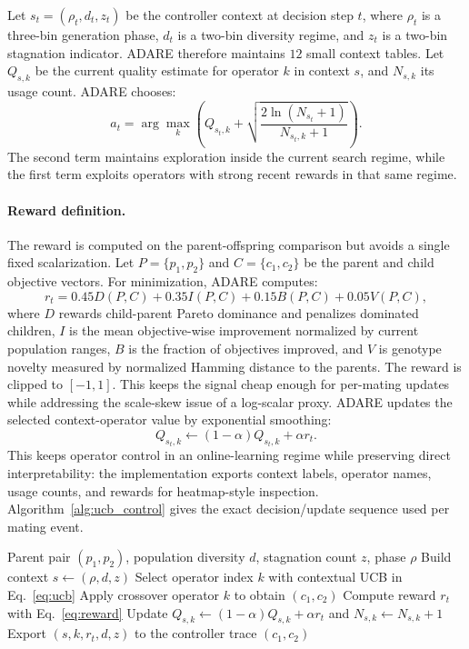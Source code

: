 \documentclass[runningheads]{llncs}
\begin{document}
Let $s_t=(\rho_t,d_t,z_t)$ be the controller context at decision step $t$, where $\rho_t$ is a three-bin generation phase, $d_t$ is a two-bin diversity regime, and $z_t$ is a two-bin stagnation indicator. ADARE therefore maintains $12$ small context tables. Let $Q_{s,k}$ be the current quality estimate for operator $k$ in context $s$, and $N_{s,k}$ its usage count. ADARE chooses:
\begin{equation}
\label{eq:ucb}
a_t = \arg\max_k \left( Q_{s_t,k} + \sqrt{\frac{2 \ln (N_{s_t}+1)}{N_{s_t,k} + 1}} \right).
\end{equation}
The second term maintains exploration inside the current search regime, while the first term exploits operators with strong recent rewards in that same regime.

\paragraph{Reward definition.}
The reward is computed on the parent-offspring comparison but avoids a single fixed scalarization. Let $P=\{p_1,p_2\}$ and $C=\{c_1,c_2\}$ be the parent and child objective vectors. For minimization, ADARE computes:
\begin{equation}
\label{eq:reward}
r_t =
0.45D(P,C) + 0.35I(P,C) + 0.15B(P,C) + 0.05V(P,C),
\end{equation}
where $D$ rewards child-parent Pareto dominance and penalizes dominated children, $I$ is the mean objective-wise improvement normalized by current population ranges, $B$ is the fraction of objectives improved, and $V$ is genotype novelty measured by normalized Hamming distance to the parents. The reward is clipped to $[-1,1]$. This keeps the signal cheap enough for per-mating updates while addressing the scale-skew issue of a log-scalar proxy. ADARE updates the selected context-operator value by exponential smoothing:
\begin{equation}
Q_{s_t,k} \leftarrow (1-\alpha)Q_{s_t,k} + \alpha r_t.
\end{equation}
This keeps operator control in an online-learning regime while preserving direct interpretability: the implementation exports context labels, operator names, usage counts, and rewards for heatmap-style inspection. Algorithm~\ref{alg:ucb_control} gives the exact decision/update sequence used per mating event.

\begin{algorithm}[H]
\caption{ADARE Pareto-Contextual UCB Crossover Control}
\label{alg:ucb_control}
\small
\begin{algorithmic}[1]
\Require Parent pair $(p_1,p_2)$, population diversity $d$, stagnation count $z$, phase $\rho$
\State Build context $s \gets (\rho,d,z)$
\State Select operator index $k$ with contextual UCB in Eq.~\eqref{eq:ucb}
\State Apply crossover operator $k$ to obtain $(c_1,c_2)$
\State Compute reward $r_t$ with Eq.~\eqref{eq:reward}
\State Update $Q_{s,k} \leftarrow (1-\alpha)Q_{s,k} + \alpha r_t$ and $N_{s,k} \leftarrow N_{s,k} + 1$
\State Export $(s,k,r_t,d,z)$ to the controller trace
\State \Return $(c_1,c_2)$
\end{algorithmic}
\end{algorithm}
\end{document}
